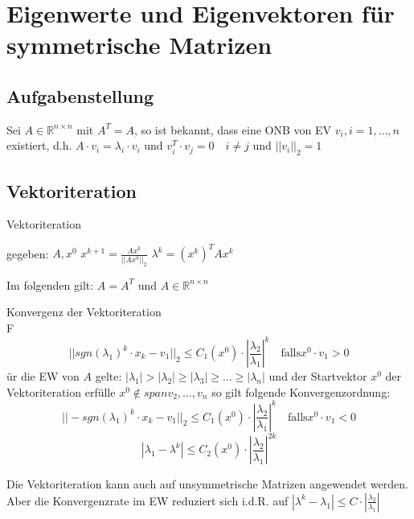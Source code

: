 \section{Eigenwerte und Eigenvektoren für symmetrische Matrizen}
\subsection{Aufgabenstellung}
Sei $A\in \mathbb{R}^{n\times n}$ mit $A^{T}=A$, so ist bekannt, dass eine ONB von EV $v_{i},i=1,\ldots,n$ existiert, d.h.
$A\cdot v_{i}=\lambda_{i}\cdot v_{i}$ und $v_{i}^{T}\cdot v_{j}=0\quad i\not = j$ und $||v_{i}||_{2}=1$

\subsection{Vektoriteration}
\begin{algorithm}
	\caption{Vektoriteration}
	\begin{algorithmic}
		\STATE gegeben: $A,x^{0}$
			\STATE $x^{k+1}=\frac{Ax^{k}}{||Ax^{k}||_{2}}$
			\STATE $\lambda^{k}=(x^{k})^{T}Ax^{k}$
		\ENDFOR
	\end{algorithmic}
\end{algorithm}


Im folgenden gilt: $A=A^{T}$ und $A\in \mathbb{R}^{n\times n}$

\begin{theorem}
	[Satz II.1] Konvergenz der Vektoriteration
	\\
	F$$||sgn(\lambda_{1})^{k}\cdot x_{k} - v_{1}||_{2} \leq C_{1}(x^{0})\cdot | \frac{\lambda_{2}}{\lambda_{1}}|^{k}\quad 
	\text{falls} x^{0}\cdot v_{1}>0$$ür die EW von $A$ gelte: $|\lambda_{1}| > |\lambda_{2}| \geq |\lambda_{3}| \geq \ldots \geq |\lambda_{n}|$
	und der Startvektor $x^{0}$ der Vektoriteration erfülle $x^{0} \not \in span{v_{2},\ldots,v_{n}}$ so gilt folgende
	Konvergenzordnung:
	$$||-sgn(\lambda_{1})^{k}\cdot x_{k} - v_{1}||_{2} \leq C_{1}(x^{0})\cdot | \frac{\lambda_{2}}{\lambda_{1}}|^{k}\quad 
	\text{falls} x^{0}\cdot v_{1}<0$$
	$$|\lambda_{1}-\lambda^{k}| \leq C_{2}(x^{0})\cdot | \frac{\lambda_{2}}{\lambda_{1}}|^{2k}$$
\end{theorem}

\begin{remark}
Die Vektoriteration kann auch auf unsymmetrische Matrizen angewendet werden. Aber die Konvergenzrate im EW reduziert sich i.d.R. auf $|\lambda^{k}-\lambda_{1}|\leq C\cdot |\frac{\lambda_{2}}{\lambda_{1}}|$
\end{remark}
